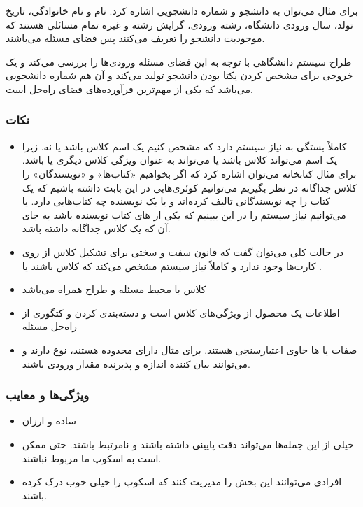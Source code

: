 برای مثال می‌توان به دانشجو و شماره دانشجویی اشاره کرد. نام و نام خانوادگی،
تاریخ تولد، سال ورودی دانشگاه، رشته ورودی، گرایش رشته و غیره تمام مسائلی هستند
که موجودیت دانشجو را تعریف می‌کنند پس فضای مسئله می‌باشند.

طراح سیستم دانشگاهی با توجه به این فضای‌ مسئله ورودی‌ها را بررسی می‌کند و یک
خروجی برای مشخص کردن یکتا بودن دانشجو تولید می‌کند و آن هم شماره دانشجویی
می‌باشد که یکی از مهم‌ترین فرآورده‌های فضای راه‌حل است.

\subsubsection*{نکات}

\begin{itemize}
    \item کاملاً بستگی به نیاز سیستم دارد که مشخص کنیم یک اسم کلاس باشد یا نه.
    زیرا یک اسم می‌تواند کلاس باشد یا می‌تواند به عنوان ویژگی کلاس دیگری یا
     باشد. برای مثال کتابخانه می‌توان اشاره کرد که اگر بخواهیم
    «کتاب‌ها» و «نویسندگان» را کلاس جداگانه در نظر بگیریم می‌توانیم کوئری‌هایی
    در این بابت داشته باشیم که یک کتاب را چه نویسندگانی تالیف کرده‌اند و یا یک
    نویسنده چه کتاب‌هایی دارد. یا می‌توانیم نیاز سیستم را در این ببینیم که یکی
    از های کتاب نویسنده باشد به جای آن که یک کلاس جداگانه داشته
    باشد.
    \item در حالت کلی می‌توان گفت که قانون سفت و سختی برای تشکیل کلاس از روی
    کارت‌ها وجود ندارد و کاملاً نیاز سیستم مشخص می‌کند که کلاس باشند یا
    .
    \item کلاس با محیط مسئله و طراح همراه می‌باشد
    \item اطلاعات یک محصول از ویژگی‌های کلاس است و دسته‌بندی کردن و کتگوری از
    راه‌حل مسئله
    \item صفات یا ها حاوی اعتبارسنجی هستند. برای مثال دارای محدوده
    هستند، نوع دارند و می‌توانند بیان کننده اندازه و پذیرنده مقدار ورودی باشند.
\end{itemize}

\subsubsection*{ویژگی‌ها و معایب}

\begin{itemize}
    \item ساده و ارزان
    \item خیلی از این جمله‌ها می‌تواند دقت پایینی داشته باشند و نامرتبط باشند.
    حتی ممکن است به اسکوپ ما مربوط نباشند.
    \item افرادی می‌توانند این بخش‌ را مدیریت کنند که اسکوپ را خیلی خوب درک کرده
    باشند.
\end{itemize}


